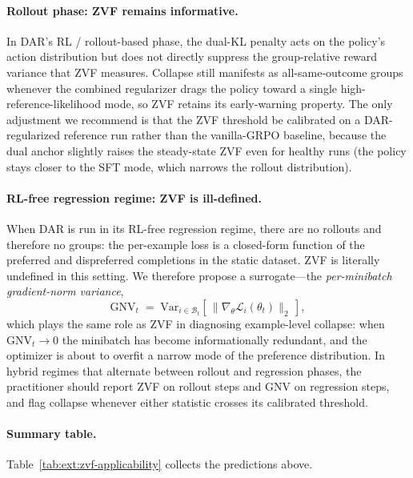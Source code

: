 \paragraph{Rollout phase: ZVF remains informative.}
In DAR's RL / rollout-based phase, the dual-KL penalty acts on the policy's
action distribution but does not directly suppress the group-relative reward
variance that ZVF measures. Collapse still manifests as all-same-outcome
groups whenever the combined regularizer drags the policy toward a single
high-reference-likelihood mode, so ZVF retains its early-warning property.
The only adjustment we recommend is that the ZVF threshold be calibrated on a
DAR-regularized reference run rather than the vanilla-GRPO baseline, because
the dual anchor slightly raises the steady-state ZVF even for healthy runs
(the policy stays closer to the SFT mode, which narrows the rollout
distribution).

\paragraph{RL-free regression regime: ZVF is ill-defined.}
When DAR is run in its RL-free regression regime, there are no rollouts and
therefore no groups: the per-example loss is a closed-form function of the
preferred and dispreferred completions in the static dataset. ZVF is
literally undefined in this setting. We therefore propose a surrogate---the
\emph{per-minibatch gradient-norm variance},
\begin{equation}
\mathrm{GNV}_t \;=\;
\mathrm{Var}_{i \in \mathcal{B}_t}\!\left[\,\bigl\lVert \nabla_\theta \mathcal{L}_i(\theta_t) \bigr\rVert_2\,\right],
\end{equation}
which plays the same role as ZVF in diagnosing example-level collapse: when
$\mathrm{GNV}_t \to 0$ the minibatch has become informationally redundant,
and the optimizer is about to overfit a narrow mode of the preference
distribution. In hybrid regimes that alternate between rollout and
regression phases, the practitioner should report ZVF on rollout steps and
$\mathrm{GNV}$ on regression steps, and flag collapse whenever either
statistic crosses its calibrated threshold.

\paragraph{Summary table.}
Table~\ref{tab:ext:zvf-applicability} collects the predictions above.

